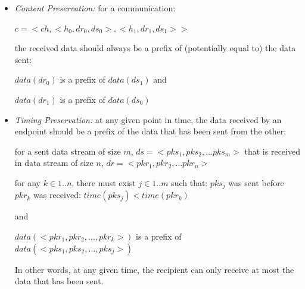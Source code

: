 \begin{itemize}
 \item \textit{ Content Preservation:} for a communication:

$c = <ch, <h_0, dr_0, ds_0>, <h_1, dr_1, ds_1>>$

the received data should always be a prefix of (potentially equal to) the data sent:

$data(dr_0)$ is a prefix of $data(ds_1)$  and

$data(dr_1)$ is a prefix of $data(ds_0)$

 \item \textit{Timing Preservation:} at any given point in time, the data received by an endpoint should be a prefix of the data that has been sent from the other:
 
for a sent data stream of size $m$, $ds= <pks_1, pks_2, ... pks_m>$ that is received in data stream of size $n$, $dr = <pkr_1, pkr_2, ... pkr_n>$

for any $k \in {1..n}$, there must exist $j \in {1..m}$ such that: $pks_j$ was sent before $pkr_k$ was received:
$  time(pks_j) < time(pkr_k)$

  and

$  data(<pkr_1, pkr_2, ..., pkr_k>)$ is a prefix of $data(<pks_1, pks_2, ..., pks_j>)$

  In other words, at any given time, the recipient can only receive at most the data that has been sent.

\end{itemize}

